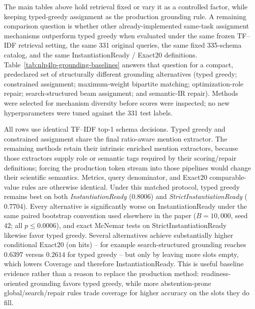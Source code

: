 \documentclass[pdflatex,sn-basic,Numbered]{sn-jnl}
\begin{document}
The main tables above hold retrieval fixed or vary it as a controlled factor, while keeping typed-greedy assignment as the production grounding rule. A remaining comparison question is whether other already-implemented same-task assignment mechanisms outperform typed greedy when evaluated under the same frozen TF--IDF retrieval setting, the same 331 original queries, the same fixed 335-schema catalog, and the same InstantiationReady / Exact20 definitions. Table~\ref{tab:nlp4lp-grounding-baselines} answers that question for a compact, predeclared set of structurally different grounding alternatives (typed greedy; constrained assignment; maximum-weight bipartite matching; optimization-role repair; search-structured beam assignment; and semantic-IR repair). Methods were selected for mechanism diversity before scores were inspected; no new hyperparameters were tuned against the 331 test labels.

All rows use identical TF--IDF top-1 schema decisions. Typed greedy and constrained assignment share the final ratio-aware mention extractor. The remaining methods retain their intrinsic enriched mention extractors, because those extractors supply role or semantic tags required by their scoring/repair definitions; forcing the production token stream into those pipelines would change their scientific semantics. Metrics, query denominator, and Exact20 comparable-value rules are otherwise identical. Under this matched protocol, typed greedy remains best on both \textit{InstantiationReady} ($0.8006$) and \textit{StrictInstantiationReady} ($0.7704$). Every alternative is significantly worse on InstantiationReady under the same paired bootstrap convention used elsewhere in the paper ($B=10{,}000$, seed $42$; all $p\leq 0.0006$), and exact McNemar tests on StrictInstantiationReady likewise favor typed greedy. Several alternatives achieve substantially higher conditional Exact20 (on hits) -- for example search-structured grounding reaches $0.6397$ versus $0.2614$ for typed greedy -- but only by leaving more slots empty, which lowers Coverage and therefore InstantiationReady. This is useful baseline evidence rather than a reason to replace the production method: readiness-oriented grounding favors typed greedy, while more abstention-prone global/search/repair rules trade coverage for higher accuracy on the slots they do fill.
\end{document}
